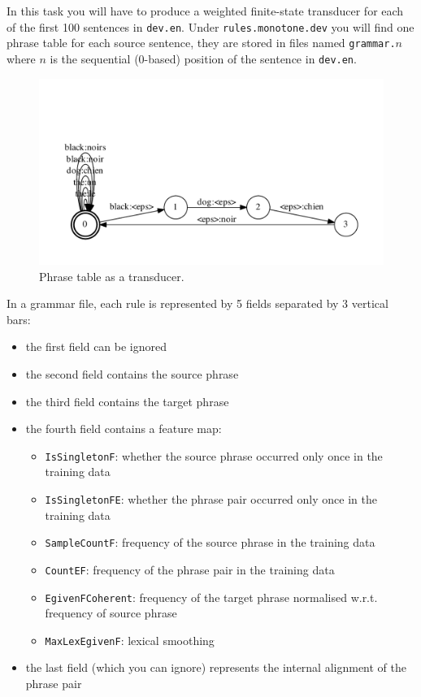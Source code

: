 In this task you will have to produce a weighted finite-state transducer for each of the first 100 sentences in \texttt{dev.en}. 
Under \texttt{rules.monotone.dev} you will find one phrase table for each source sentence, they are stored in files named \texttt{grammar.$n$} where \texttt{$n$} is the sequential (0-based) position of the sentence in \texttt{dev.en}.


\begin{figure}[h]\centering
\includegraphics[scale=0.5]{table.pdf}
\caption{\label{fig:rules}Phrase table as a transducer.}
\end{figure}

In a grammar file, each rule is represented by 5 fields separated by 3 vertical bars:

\begin{itemize}
	\item the first field can be ignored
	\item the second field contains the source phrase
	\item the third field contains the target phrase
	\item the fourth field contains a feature map:
		\begin{itemize}
			\item \texttt{IsSingletonF}: whether the source phrase occurred only once in the training data
			\item \texttt{IsSingletonFE}: whether the phrase pair occurred only once in the training data
			\item \texttt{SampleCountF}: frequency of the source phrase in the training data 
			\item \texttt{CountEF}: frequency of the phrase pair in the training data 
			\item \texttt{EgivenFCoherent}: frequency of the target phrase normalised w.r.t. frequency of source phrase
			\item \texttt{MaxLexEgivenF}: lexical smoothing
		\end{itemize}
	\item the last field (which you can ignore) represents the internal alignment of the phrase pair
\end{itemize}

